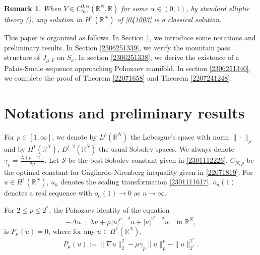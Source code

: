 \documentclass[10pt]{article}
\numberwithin{equation}{section}
\newtheorem{remark}[theorem]{Remark}
\numberwithin{equation}{section}
\begin{document}
\begin{remark}\label{2302161844}
When $V\in C_{loc}^{0,\alpha}(\mathbb{R}^N, \mathbb{R})$ for some $\alpha\in (0,1)$, by standard elliptic theory (\cite[B.3 Lemma, B.2 Theorem]{Struwe2008}), any solution in $H^1(\mathbb{R}^N)$ of \eqref{041003} is a classical solution.
\end{remark}
This paper is organized as follows. In Section \ref{2306251337}, we introduce some notations and preliminary results. In Section \ref{2306251339}, we verify the mountain pass structure of $J_{\mu, V}$ on $S_a$. In section \ref{2306251338}, we derive the existence of a Palais-Smale sequence approaching Pohozaev manifold. In section \ref{2306251340}, we complete the proof of Theorem \ref{22071658} and Theorem \ref{2207241248}.

\section{Notations and preliminary results}\label{2306251337}
For $p\in [1, \infty]$, we denote by $L^p(\mathbb{R}^N)$ the Lebesgue's space with norm $\|\cdot\|_p$ and by $H^1(\mathbb{R}^N)$, $D^{1,2}(\mathbb{R}^N)$ the usual Sobolev spaces. We always denote $\gamma_p=\frac{N(p-2)}{2p}$. Let $\mathcal{S}$ be the best Sobolev constant given in \eqref{2301112226}, $C_{N, p}$ be the optimal constant for Gagliardo-Nirenberg inequality given in \eqref{22071819}. For $u\in H^1(\mathbb{R}^N)$, $u_h$ denotes the scaling transformation \eqref{2301111617}. $o_n(1)$ denotes a real sequence with $o_n(1)\to 0$ as $n\to \infty$.

For $2 \leq p \leq 2^*$, the Pohozaev identity of the equation
\begin{equation}\label{22071100}
-\Delta u=\lambda u+ \mu|u|^{p-2}u+ |u|^{2^*-2}u~ \;\;\text { in } \mathbb{R}^N,
\end{equation}
is $P_\mu(u)=0$, where for any $u\in H^1(\mathbb{R}^N)$,
\begin{equation}\label{2306281307}
P_{\mu}(u):= \|\nabla u\|_2^2-\mu \gamma_p\|u\|_p^p-\|u\|_{2^*}^{2^*}.
\end{equation}
\end{document}
